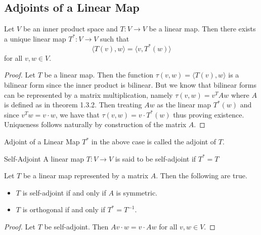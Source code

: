 \documentclass[a4paper]{article}
\begin{document}
\subsection{Adjoints of a Linear Map}
\begin{prp}{}{} Let $V$ be an inner product space and $T:V\to V$ be a linear map. Then there exists a unique linear map $T^\ast:V\to V$ such that $$\langle T(v), w\rangle=\langle v, T^\ast(w)\rangle$$ for all $v,w\in V$. \tcbline
\begin{proof}
Let $T$ be a linear map. Then the function $\tau(v,w)=\langle T(v), w\rangle$ is a bilinear form since the inner product is bilinear. But we know that bilinear forms can be represented by a matrix multiplication, namely $\tau(v,w)=v^TAw$ where $A$ is defined as in theorem 1.3.2. Then treating $Aw$ as the linear map $T^\ast(w)$ and since $v^Tw=v\cdot w$, we have that $\tau(v,w)=v\cdot T^\ast(w)$ thus proving existence. Uniqueness follows naturally by construction of the matrix $A$. 
\end{proof}
\end{prp}

\begin{defn}{Adjoint of a Linear Map}{} $T^\ast$ in the above case is called the adjoint of $T$. 
\end{defn}

\begin{defn}{Self-Adjoint}{} A linear map $T:V\to V$ is said to be self-adjoint if $T^*=T$
\end{defn}

\begin{prp}{}{} Let $T$ be a linear map represented by a matrix $A$. Then the following are true. 
\begin{itemize}
\item $T$ is self-adjoint if and only if $A$ is symmetric. 
\item $T$ is orthogonal if and only if $T^\ast=T^{-1}$. 
\end{itemize}
\tcbline
\begin{proof}
Let $T$ be self-adjoint. Then $Av\cdot w=v\cdot Aw$ for all $v,w\in V$. 
\end{proof}
\end{prp}
\end{document}
